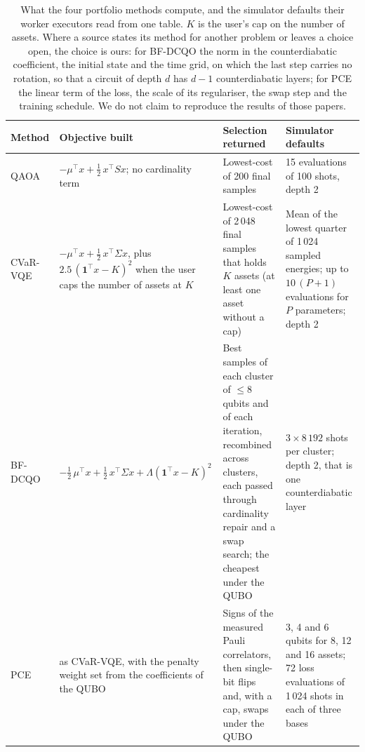 \documentclass[11pt,a4paper]{article}
\begin{document}
\begin{table}[H]
\centering\footnotesize\setlength{\tabcolsep}{4pt}
\begin{tabular}{p{1.6cm}p{4.5cm}p{4.3cm}p{3.8cm}}
\toprule
Method & Objective built & Selection returned & Simulator defaults \\
\midrule
QAOA & $-\mu^\top x + \tfrac12\,x^\top S x$; no cardinality term & Lowest-cost of 200 final samples & 15 evaluations of 100 shots, depth 2 \\
CVaR-VQE & $-\mu^\top x + \tfrac12\,x^\top\Sigma x$, plus $2.5\,(\mathbf 1^\top x - K)^2$ when the user caps the number of assets at $K$ & Lowest-cost of 2\,048 final samples that holds $K$ assets (at least one asset without a cap) & Mean of the lowest quarter of 1\,024 sampled energies; up to $10\,(P+1)$ evaluations for $P$ parameters; depth 2 \\
BF-DCQO & $-\tfrac12\,\mu^\top x + \tfrac12\,x^\top\Sigma x + \Lambda(\mathbf 1^\top x - K)^2$ & Best samples of each cluster of $\le 8$ qubits and of each iteration, recombined across clusters, each passed through cardinality repair and a swap search; the cheapest under the QUBO & $3 \times 8\,192$ shots per cluster; depth 2, that is one counterdiabatic layer \\
PCE & as CVaR-VQE, with the penalty weight set from the coefficients of the QUBO & Signs of the measured Pauli correlators, then single-bit flips and, with a cap, swaps under the QUBO & 3, 4 and 6 qubits for 8, 12 and 16 assets; 72 loss evaluations of 1\,024 shots in each of three bases \\
\bottomrule
\end{tabular}
\caption{What the four portfolio methods compute, and the simulator
defaults their worker executors read from one table. $K$ is the user's cap
on the number of assets. Where a source states its method for another
problem or leaves a choice open, the choice is ours: for BF-DCQO the norm in
the counterdiabatic coefficient, the initial state and the time grid, on
which the last step carries no rotation, so that a circuit of depth $d$ has
$d-1$ counterdiabatic layers; for PCE the linear term of the loss, the scale
of its regulariser, the swap step and the training schedule. We do not claim
to reproduce the results of those papers.}
\label{tab:pf-corrected}
\end{table}
\end{document}
